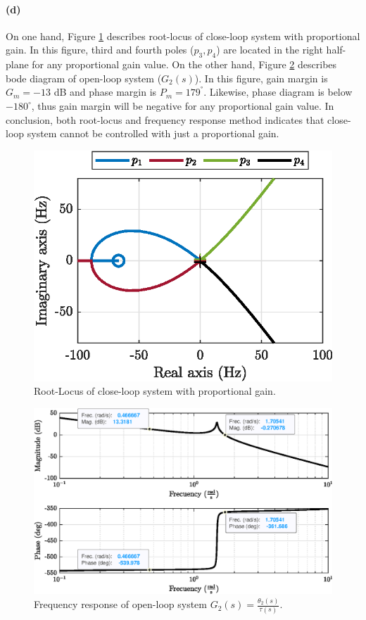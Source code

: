 \paragraph{(d)} On one hand, Figure \ref{fig:q3_rlocus_K_CL} describes root-locus of close-loop system with proportional gain. In this figure, third and fourth poles ($p_3, p_4$) are located in the right half-plane for any proportional gain value. On the other hand, Figure \ref{fig:q3_bode_K_OL} describes bode diagram of open-loop system ($G_2(s)$). In this figure, gain margin is $G_m=-13$ dB and phase margin is $P_m=179^{°}$. Likewise, phase diagram is below $-180^{\circ}$, thus gain margin will be negative for any proportional gain value. In conclusion, both root-locus and frequency response method indicates that close-loop system cannot be controlled with just a proportional gain.


\begin{figure}[h!]
\centering
\includegraphics{images/question3/q3_rlocus_K_CL.eps}
\caption{Root-Locus of close-loop system with proportional gain.}
\label{fig:q3_rlocus_K_CL}
\end{figure}


\begin{figure}[h!]
\centering
\includegraphics{images/question3/q3_bode_K_OL.eps}
\caption{Frequency response of open-loop system $G_2(s)=\frac{\theta_2(s)}{\tau(s)}$.}
\label{fig:q3_bode_K_OL}
\end{figure}









